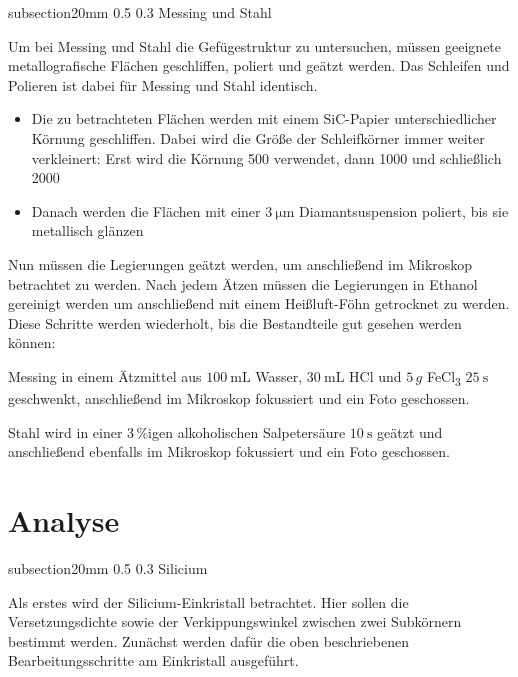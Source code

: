 \documentclass[german, %
parskip=full, %
bibliography=totoc, %
]{scrartcl}
\makeatletter
\renewcommand\subsection{\@startsection 
   {subsection}{2}{0mm}%
   {0.5\baselineskip}%
   {0.3\baselineskip}%
   {\bfseries\sffamily\large}%
   }
\makeatother
\begin{document}
\subsection{Messing und Stahl}

Um bei Messing und Stahl die Gefügestruktur zu untersuchen, müssen geeignete metallografische Flächen geschliffen, poliert und geätzt werden. Das Schleifen und Polieren ist dabei für Messing und Stahl identisch. 

\begin{itemize}
\item[1.] Die zu betrachteten Flächen werden mit einem SiC-Papier unterschiedlicher Körnung geschliffen. Dabei wird die Größe der Schleifkörner immer weiter verkleinert: Erst wird die Körnung 500 verwendet, dann 1000 und schließlich 2000
\item[2.] Danach werden die Flächen mit einer \(\SI{3}{\micro\meter}\) Diamantsuspension poliert, bis sie metallisch glänzen
\end{itemize}

Nun müssen die Legierungen geätzt werden, um anschließend im Mikroskop betrachtet zu werden. Nach jedem Ätzen müssen die Legierungen in Ethanol gereinigt werden um anschließend mit einem Heißluft-Föhn getrocknet zu werden. Diese Schritte werden wiederholt, bis die Bestandteile gut gesehen werden können:

Messing in einem Ätzmittel aus \(\SI{100}{\milli\liter}\) Wasser, \(\SI{30}{\milli\liter}\) HCl und $5\,g$ FeCl\textsubscript{3} \(\SI{25}{\second}\) geschwenkt, anschließend im Mikroskop fokussiert und ein Foto geschossen.

Stahl wird in einer 3\,\%igen alkoholischen Salpetersäure \(\SI{10}{\second}\) geätzt und anschließend ebenfalls im Mikroskop fokussiert und ein Foto geschossen.

\section{Analyse}

\subsection{Silicium}

Als erstes wird der Silicium-Einkristall betrachtet. Hier sollen die Versetzungsdichte sowie der Verkippungswinkel zwischen zwei Subkörnern bestimmt werden. Zunächst werden dafür die oben beschriebenen Bearbeitungsschritte am Einkristall ausgeführt. 
\end{document}
